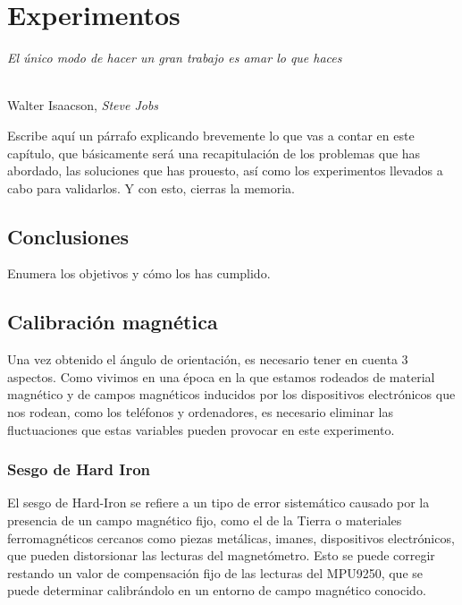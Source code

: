 \chapter{Experimentos}
\label{cap:capitulo6}

\begin{flushright}
\begin{minipage}[]{10cm}
\emph{El único modo de hacer un gran trabajo es amar lo que haces}\\
\end{minipage}\\

Walter Isaacson, \textit{Steve Jobs}\\
\end{flushright}

\vspace{1cm}

Escribe aquí un párrafo explicando brevemente lo que vas a contar en este capítulo, que básicamente será una recapitulación de los problemas que has abordado, las soluciones que has prouesto, así como los experimentos llevados a cabo para validarlos. Y con esto, cierras la memoria.

\section{Conclusiones}

Enumera los objetivos y cómo los has cumplido.\\



\section{Calibración magnética}
\label{sec:cal_mag}

Una vez obtenido el ángulo de orientación,  es necesario tener en cuenta 3 aspectos. Como vivimos en una época en la que estamos rodeados de material magnético y de campos magnéticos inducidos por los dispositivos electrónicos que nos rodean, como los teléfonos y ordenadores, es necesario eliminar las fluctuaciones que estas variables pueden provocar en este experimento.\\

\subsection{Sesgo de Hard Iron}
\label{subsec:hard_iron}

El sesgo de Hard-Iron se refiere a un tipo de error sistemático causado por la presencia de un campo magnético fijo, como el de la Tierra o materiales ferromagnéticos cercanos como piezas metálicas, imanes, dispositivos electrónicos, que pueden distorsionar las lecturas del magnetómetro. Esto se puede corregir restando un valor de compensación fijo de las lecturas del MPU9250, que se puede determinar calibrándolo en un entorno de campo magnético conocido.

